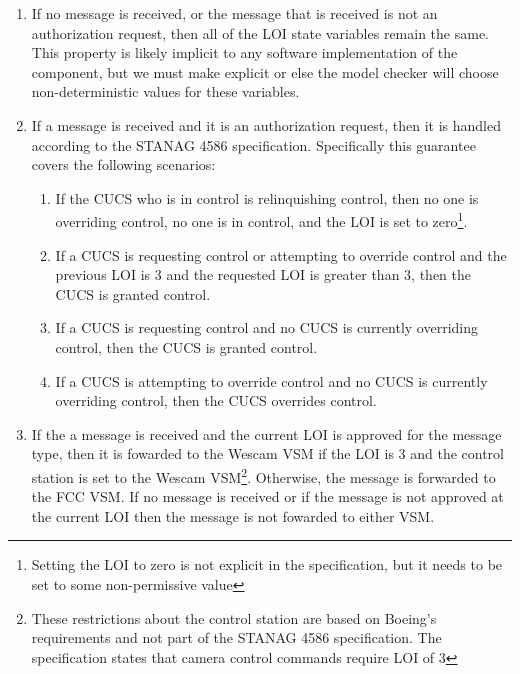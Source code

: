\documentclass{llncs}
\begin{document}
\begin{enumerate}
\item If no message is received, or the message that is received is not an authorization request, then all of the LOI state variables remain the same.  This property is likely implicit to any software implementation of the component, but we must make explicit or else the model checker will choose non-deterministic values for these variables.

\item If a message is received and it is an authorization request, then it is handled according to the STANAG 4586 specification.  Specifically this guarantee covers the following scenarios:

\begin{enumerate}
\item If the CUCS who is in control is relinquishing control, then no one is overriding control, no one is in control, and the LOI is set to zero\footnote{Setting the LOI to zero is not explicit in the specification, but it needs to be set to some non-permissive value}.

\item If a CUCS is requesting control or attempting to override control and the previous LOI is 3 and the requested LOI is greater than 3, then the CUCS is granted control.

\item If a CUCS is requesting control and no CUCS is currently overriding control, then the CUCS is granted control.

\item If a CUCS is attempting to override control and no CUCS is currently overriding control, then the CUCS overrides control.
\end{enumerate}

\item If the a message is received and the current LOI is approved for the message type, then it is fowarded to the Wescam VSM if the LOI is 3 and the control station is set to the Wescam VSM\footnote{These restrictions about the control station are based on Boeing's requirements and not part of the STANAG 4586 specification. The specification states that camera control commands require LOI of 3}.  Otherwise, the message is forwarded to the FCC VSM.  If no message is received or if the message is not approved at the current LOI then the message is not fowarded to either VSM.

\end{enumerate}
\end{document}
